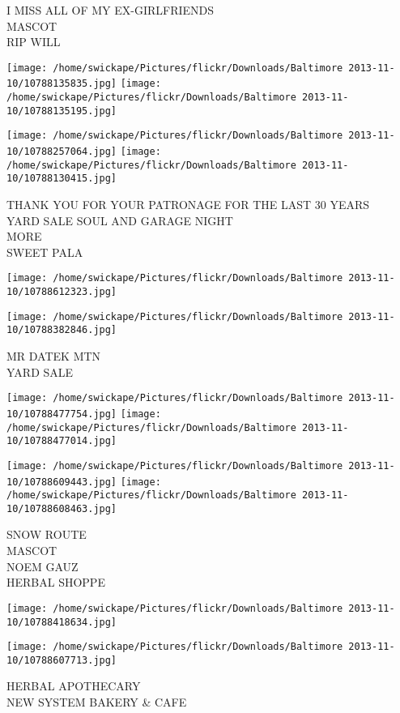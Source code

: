 \documentclass[10pt,letterpaper]{article}
\begin{document}
I MISS ALL OF MY EX{-}GIRLFRIENDS\\
MASCOT\\
RIP WILL
\pagebreak

\texttt{[image: /home/swickape/Pictures/flickr/Downloads/Baltimore 2013-11-10/10788135835.jpg]}
\texttt{[image: /home/swickape/Pictures/flickr/Downloads/Baltimore 2013-11-10/10788135195.jpg]}

\texttt{[image: /home/swickape/Pictures/flickr/Downloads/Baltimore 2013-11-10/10788257064.jpg]}
\texttt{[image: /home/swickape/Pictures/flickr/Downloads/Baltimore 2013-11-10/10788130415.jpg]}

THANK YOU FOR YOUR PATRONAGE FOR THE LAST 30 YEARS\\
YARD SALE SOUL AND GARAGE NIGHT\\
MORE\\
SWEET PALA
\pagebreak

\texttt{[image: /home/swickape/Pictures/flickr/Downloads/Baltimore 2013-11-10/10788612323.jpg]}

\vspace{0.25in}
\texttt{[image: /home/swickape/Pictures/flickr/Downloads/Baltimore 2013-11-10/10788382846.jpg]}

MR DATEK MTN\\
YARD SALE
\pagebreak

\texttt{[image: /home/swickape/Pictures/flickr/Downloads/Baltimore 2013-11-10/10788477754.jpg]}
\texttt{[image: /home/swickape/Pictures/flickr/Downloads/Baltimore 2013-11-10/10788477014.jpg]}

\texttt{[image: /home/swickape/Pictures/flickr/Downloads/Baltimore 2013-11-10/10788609443.jpg]}
\texttt{[image: /home/swickape/Pictures/flickr/Downloads/Baltimore 2013-11-10/10788608463.jpg]}

SNOW ROUTE\\
MASCOT\\
NOEM GAUZ\\
HERBAL SHOPPE
\pagebreak

\texttt{[image: /home/swickape/Pictures/flickr/Downloads/Baltimore 2013-11-10/10788418634.jpg]}

\vspace{0.25in}
\texttt{[image: /home/swickape/Pictures/flickr/Downloads/Baltimore 2013-11-10/10788607713.jpg]}

HERBAL APOTHECARY\\
NEW SYSTEM BAKERY \& CAFE
\pagebreak
\end{document}
